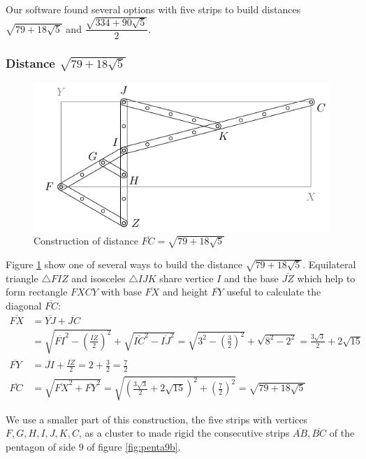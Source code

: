 \documentclass[11pt]{article}
\begin{document}
Our software found several options with five strips to build distances $\sqrt{79 + 18\sqrt5}$
and $\dfrac{\sqrt{334 + 90\sqrt5}}2$.

\subsubsection{Distance $\sqrt{79 + 18\sqrt5}$}

\begin{figure}[H]
\centering
\includegraphics[scale=1]{9/cluster9b1}
\caption{Construction of distance $\overline{FC}=\sqrt{79 + 18\sqrt5}$}
\label{fig:cluster9b1}
\end{figure}

Figure \ref{fig:cluster9b1} show one of several ways to build the distance $\sqrt{79 + 18\sqrt5}$. 
Equilateral triangle $\triangle{FIZ}$ and isosceles $\triangle{IJK}$ share vertice $I$ and the base $\overline{JZ}$ which help to form rectangle $FXCY$ with base $\overline{FX}$ and height $\overline{FY}$ useful to calculate the diagonal $\overline{FC}$:
\begin{align}
\overline{FX} &= \overline{YJ} + \overline{JC}\nonumber\\
 &= \sqrt{\overline{FI}^2 - \left(\frac{\overline{IZ}}2\right)^2}
  + \sqrt{\overline{IC}^2 - \overline{IJ}^2}
  = \sqrt{3^2 - \left(\frac{3}2\right)^2} + \sqrt{8^2 - 2^2} 
  = \frac{3\sqrt3}2 + 2\sqrt{15} \nonumber\\
\overline{FY} &= \overline{JI} + \frac{\overline{IZ}}2
  = 2 + \frac{3}2 = \frac{7}2 \nonumber\\
\overline{FC} &= \sqrt{\overline{FX}^2 + \overline{FY}^2}
 = \sqrt{\left(\frac{3\sqrt3}2 + 2\sqrt{15}\right)^2 + \left(\frac{7}2\right)^2}
 = \sqrt{79 + 18\sqrt5}
\end{align}

We use a smaller part of this construction, the five strips with vertices $F,G,H,I,J,K,C$, as a cluster to made rigid the consecutive strips $\overline{AB},\overline{BC}$ of the pentagon of side $9$ of figure \ref{fig:penta9b}.
\end{document}
